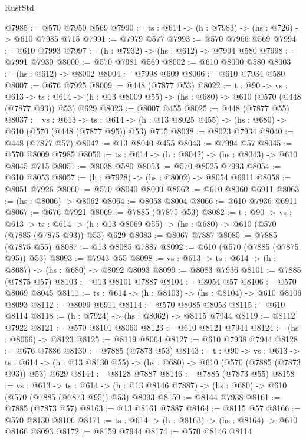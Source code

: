 \begin{lexlean}{RustStd}
\begin{coremodule}
@7985 := @570 @7950 @569
@7990 := {ts : @614} -> (h : @7983) -> (hs : @726) -> @610 @7985 @715
@7991 := @7979 @577
@7993 := @570 @7966 @569
@7994 := @610 @7993
@7997 := (h : @7932) -> (hs : @612) -> @7994 @580
@7998 := @7991 @7930
@8000 := @570 @7981 @569
@8002 := @610 @8000 @580
@8003 := (hs : @612) -> @8002
@8004 := @7998 @609
@8006 := @610 @7934 @580
@8007 := @676 @7925
@8009 := @448 (@7877 @53)
@8022 := {t : @90} ->
  {vs : @613} ->
  {ts : @614} -> (h : @13 @8009 @55) -> (hs : @680) -> @610 (@570 (@448 (@7877 @93)) @53) @629
@8023 := @8007 @455
@8025 := @448 (@7877 @55)
@8037 := {vs : @613} ->
  {ts : @614} -> (h : @13 @8025 @455) -> (hs : @680) -> @610 (@570 (@448 (@7877 @95)) @53) @715
@8038 := @8023 @7934
@8040 := @448 (@7877 @57)
@8042 := @13 @8040 @455
@8043 := @7994 @57
@8045 := @570 @8009 @7985
@8050 := {ts : @614} -> (h : @8042) -> (hs : @8043) -> @610 @8045 @715
@8051 := @8038 @580
@8053 := @570 @8025 @7993
@8054 := @610 @8053
@8057 := (h : @7928) -> (hs : @8002) -> @8054 @6911
@8058 := @8051 @7926
@8060 := @570 @8040 @8000
@8062 := @610 @8060 @6911
@8063 := (hs : @8006) -> @8062
@8064 := @8058 @8004
@8066 := @610 @7936 @6911
@8067 := @676 @7921
@8069 := @7885 (@7875 @53)
@8082 := {t : @90} ->
  {vs : @613} ->
  {ts : @614} -> (h : @13 @8069 @55) -> (hs : @680) -> @610 (@570 (@7885 (@7875 @93)) @53) @629
@8083 := @8067 @7887
@8085 := @7885 (@7875 @55)
@8087 := @13 @8085 @7887
@8092 := @610 (@570 (@7885 (@7875 @95)) @53)
@8093 := @7943 @55
@8098 := {vs : @613} -> {ts : @614} -> (h : @8087) -> (hs : @680) -> @8092 @8093
@8099 := @8083 @7936
@8101 := @7885 (@7875 @57)
@8103 := @13 @8101 @7887
@8104 := @8054 @57
@8106 := @570 @8069 @8045
@8111 := {ts : @614} -> (h : @8103) -> (hs : @8104) -> @610 @8106 @8093
@8112 := @8099 @6911
@8114 := @570 @8085 @8053
@8115 := @610 @8114
@8118 := (h : @7924) -> (hs : @8062) -> @8115 @7944
@8119 := @8112 @7922
@8121 := @570 @8101 @8060
@8123 := @610 @8121 @7944
@8124 := (hs : @8066) -> @8123
@8125 := @8119 @8064
@8127 := @610 @7938 @7944
@8128 := @676 @7886
@8130 := @7885 (@7873 @53)
@8143 := {t : @90} ->
  {vs : @613} ->
  {ts : @614} -> (h : @13 @8130 @55) -> (hs : @680) -> @610 (@570 (@7885 (@7873 @93)) @53) @629
@8144 := @8128 @7887
@8146 := @7885 (@7873 @55)
@8158 := {vs : @613} ->
  {ts : @614} -> (h : @13 @8146 @7887) -> (hs : @680) -> @610 (@570 (@7885 (@7873 @95)) @53) @8093
@8159 := @8144 @7938
@8161 := @7885 (@7873 @57)
@8163 := @13 @8161 @7887
@8164 := @8115 @57
@8166 := @570 @8130 @8106
@8171 := {ts : @614} -> (h : @8163) -> (hs : @8164) -> @610 @8166 @8093
@8172 := @8159 @7944
@8174 := @570 @8146 @8114

\end{coremodule}
\end{lexlean}
